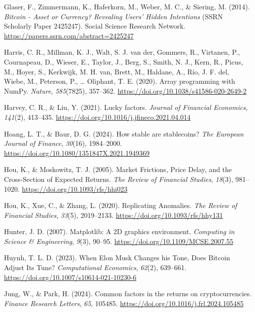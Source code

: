 \documentclass[
  12pt,
  a4paper,
  openany]{scrbook}
\newlength{\cslhangindent}
\newenvironment{CSLReferences}[2] %
 {\begin{list}{}{%
  \setlength{\itemindent}{0pt}
  \setlength{\leftmargin}{0pt}
  \setlength{\parsep}{0pt}
  \ifodd #1
   \setlength{\leftmargin}{\cslhangindent}
   \setlength{\itemindent}{-1\cslhangindent}
  \fi
  \setlength{\itemsep}{#2\baselineskip}}}
 {\end{list}}
\begin{document}
\begin{CSLReferences}{1}{0}
Glaser, F., Zimmermann, K., Haferkorn, M., Weber, M. C., \& Siering, M.
(2014). \emph{Bitcoin - Asset or Currency? Revealing Users' Hidden
Intentions} (SSRN Scholarly Paper 2425247). Social Science Research
Network. \url{https://papers.ssrn.com/abstract=2425247}

Harris, C. R., Millman, K. J., Walt, S. J. van der, Gommers, R.,
Virtanen, P., Cournapeau, D., Wieser, E., Taylor, J., Berg, S., Smith,
N. J., Kern, R., Picus, M., Hoyer, S., Kerkwijk, M. H. van, Brett, M.,
Haldane, A., Río, J. F. del, Wiebe, M., Peterson, P., \ldots{} Oliphant,
T. E. (2020). Array programming with {NumPy}. \emph{Nature},
\emph{585}(7825), 357--362.
\url{https://doi.org/10.1038/s41586-020-2649-2}

Harvey, C. R., \& Liu, Y. (2021). Lucky factors. \emph{Journal of
Financial Economics}, \emph{141}(2), 413--435.
\url{https://doi.org/10.1016/j.jfineco.2021.04.014}

Hoang, L. T., \& Baur, D. G. (2024). How stable are stablecoins?
\emph{The European Journal of Finance}, \emph{30}(16), 1984--2000.
\url{https://doi.org/10.1080/1351847X.2021.1949369}

Hou, K., \& Moskowitz, T. J. (2005). Market Frictions, Price Delay, and
the Cross-Section of Expected Returns. \emph{The Review of Financial
Studies}, \emph{18}(3), 981--1020.
\url{https://doi.org/10.1093/rfs/hhi023}

Hou, K., Xue, C., \& Zhang, L. (2020). Replicating Anomalies. \emph{The
Review of Financial Studies}, \emph{33}(5), 2019--2133.
\url{https://doi.org/10.1093/rfs/hhy131}

Hunter, J. D. (2007). Matplotlib: A 2D graphics environment.
\emph{Computing in Science \& Engineering}, \emph{9}(3), 90--95.
\url{https://doi.org/10.1109/MCSE.2007.55}

Huynh, T. L. D. (2023). When Elon Musk Changes his Tone, Does Bitcoin
Adjust Its Tune? \emph{Computational Economics}, \emph{62}(2), 639--661.
\url{https://doi.org/10.1007/s10614-021-10230-6}

Jung, W., \& Park, H. (2024). Common factors in the returns on
cryptocurrencies. \emph{Finance Research Letters}, \emph{65}, 105485.
\url{https://doi.org/10.1016/j.frl.2024.105485}


\end{CSLReferences}
\end{document}
